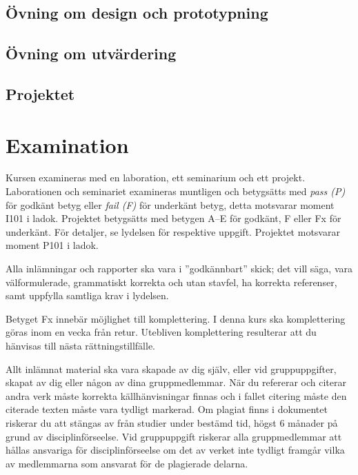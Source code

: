\documentclass[a4paper,logo]{miunart}
\begin{document}
\subsection{Övning om design och prototypning}


\subsection{Övning om utvärdering}


\subsection{Projektet}



\section{Examination}

Kursen examineras med en laboration, ett seminarium och ett projekt.
Laborationen och seminariet examineras muntligen och betygsätts med \emph{pass 
(P)} för godkänt betyg eller \emph{fail (F)} för underkänt betyg, detta 
motsvarar moment I101 i ladok.
Projektet betygsätts med betygen A--E för godkänt, F eller Fx för underkänt.
För detaljer, se lydelsen för respektive uppgift.
Projektet motsvarar moment P101 i ladok.

Alla inlämningar och rapporter ska vara i ''godkännbart'' skick; det vill säga, 
vara välformulerade, grammatiskt korrekta och utan stavfel, ha korrekta 
referenser, samt uppfylla samtliga krav i lydelsen.

Betyget Fx innebär möjlighet till komplettering.
I denna kurs ska komplettering göras inom en vecka från retur.
Utebliven komplettering resulterar att du hänvisas till nästa
rättningstillfälle.

Allt inlämnat material ska vara skapade av dig själv, eller vid gruppuppgifter, 
skapat av dig eller någon av dina gruppmedlemmar.
När du refererar och citerar andra verk måste korrekta källhänvisningar finnas 
och i fallet citering måste den citerade texten måste vara tydligt markerad.
Om plagiat finns i dokumentet riskerar du att stängas av från studier under 
bestämd tid, högst 6 månader på grund av disciplinförseelse.
Vid gruppuppgift riskerar alla gruppmedlemmar att hållas ansvariga
för disciplinförseelse om det av verket inte tydligt framgår vilka av
medlemmarna som ansvarat för de plagierade delarna.
\end{document}
